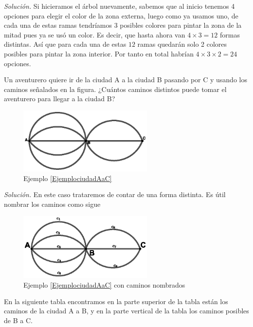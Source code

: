 \textit{Solución.} Si hicieramos el árbol nuevamente, sabemos que al inicio tenemos 4 opciones para elegir el color de la zona externa, luego como ya usamos uno, de cada una de estas ramas tendríamos 3 posibles colores para pintar la zona de la mitad pues ya se usó un color. Es decir, que hasta ahora van $4\times 3=12$ formas distintas. Así que para cada una de estas $12$ ramas quedarán solo 2 colores posibles para pintar la zona interior. Por tanto en total habrían $4\times 3\times 2=24$ opciones.

\begin{ejemplo}
	Un aventurero quiere ir de la ciudad A a la ciudad B pasando por C y usando los caminos señalados en la figura. ¿Cuántos caminos distintos puede tomar el aventurero para llegar a la ciudad B?\\
	\label{EjemplociudadAaC}
\end{ejemplo}

\begin{figure}[H]
	\centering
	\includegraphics[width=0.6\textwidth]{Combinatoria/imgs/CAMINOSAaC.eps}
	\caption{Ejemplo \ref{EjemplociudadAaC}}
	\label{caminosAaC}
\end{figure}

\textit{Solución. }En este caso trataremos de contar de una forma distinta. Es útil nombrar los caminos como sigue

\begin{figure}[H]
	\centering
	\includegraphics[width=0.6\textwidth]{Combinatoria/imgs/CAMINOSAaCrotulados.eps}
	\caption{Ejemplo \ref{EjemplociudadAaC} con caminos nombrados}
	\label{caminosAaCrotulados}
\end{figure}

En la siguiente tabla encontramos en la parte superior de la tabla están los caminos de la ciudad A a B, y en la parte vertical de la tabla los caminos posibles de B a C.


